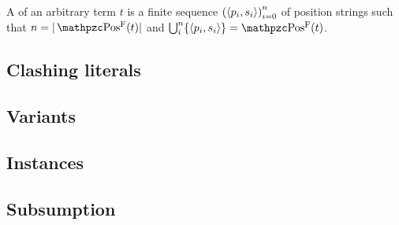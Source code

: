 	\begin{definition}
		A  of an arbitrary term \( t \)
		is a finite sequence
		\( {( \langle p_i,s_i\rangle )}^{n}_{i=0}
			\)
		of position strings such that
		\( n = |\posS(t)| \) and
		\( \bigcup_{i}^{n} \{\ANGLES{p_i,s_i}\} = \posS(t) \).


	\end{definition}

















\subsection{Clashing literals}

\subsection{Variants}

\subsection{Instances}

\subsection{Subsumption}



